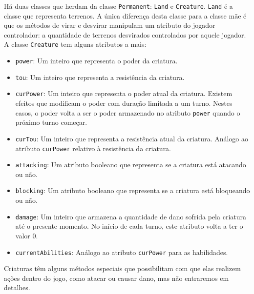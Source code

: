 Há duas classes que herdam da classe \texttt{Permanent}: \texttt{Land} e \texttt{Creature}.
\texttt{Land} é a classe que representa terrenos. A única diferença desta classe para a classe
mãe é que os métodos de virar e desvirar manipulam um atributo do jogador controlador: a quantidade
de terrenos desvirados controlados por aquele jogador. A classe \texttt{Creature} tem alguns
atributos a mais:
\begin{itemize}
  \item\texttt{power}: Um inteiro que representa o poder da criatura.
  \item\texttt{tou}: Um inteiro que representa a resistência da criatura.
  \item\texttt{curPower}: Um inteiro que representa o poder atual da criatura. Existem efeitos
  que modificam o poder com duração limitada a um turno. Nestes casos, o poder volta a ser o
  poder armazenado no atributo \texttt{power} quando o próximo turno começar.
  \item\texttt{curTou}: Um inteiro que representa a resistência atual da criatura. Análogo ao
  atributo \texttt{curPower} relativo à resistência da criatura.
  \item\texttt{attacking}: Um atributo booleano que representa se a criatura está atacando
  ou não.
  \item\texttt{blocking}: Um atributo booleano que representa se a criatura está bloqueando
  ou não.
  \item\texttt{damage}: Um inteiro que armazena a quantidade de dano sofrida pela criatura até
  o presente momento. No início de cada turno, este atributo volta a ter o valor $0$.
  \item\texttt{currentAbilities}: Análogo ao atributo \texttt{curPower} para as habilidades.
\end{itemize}
Criaturas têm alguns métodos especiais que possibilitam com que elas realizem ações dentro
do jogo, como atacar ou causar dano, mas não entraremos em detalhes.

